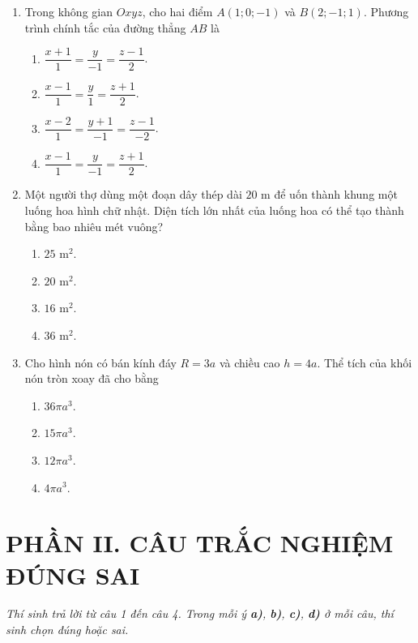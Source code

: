 \documentclass[12pt,a4paper]{article}
\begin{document}
\begin{enumerate}[label=\textbf{Câu \arabic*:}, leftmargin=*]
\item Trong không gian $Oxyz$, cho hai điểm $A(1; 0; -1)$ và $B(2; -1; 1)$. Phương trình chính tắc của đường thẳng $AB$ là
\begin{enumerate}[label=\Alph*.]
    \item $\dfrac{x + 1}{1} = \dfrac{y}{-1} = \dfrac{z - 1}{2}$.
    \item $\dfrac{x - 1}{1} = \dfrac{y}{1} = \dfrac{z + 1}{2}$.
    \item $\dfrac{x - 2}{1} = \dfrac{y + 1}{-1} = \dfrac{z - 1}{-2}$.
    \item $\dfrac{x - 1}{1} = \dfrac{y}{-1} = \dfrac{z + 1}{2}$.
\end{enumerate}

\item Một người thợ dùng một đoạn dây thép dài $20\text{ m}$ để uốn thành khung một luống hoa hình chữ nhật. Diện tích lớn nhất của luống hoa có thể tạo thành bằng bao nhiêu mét vuông?
\begin{enumerate}[label=\Alph*.]
    \item $25\text{ m}^2$.
    \item $20\text{ m}^2$.
    \item $16\text{ m}^2$.
    \item $36\text{ m}^2$.
\end{enumerate}

\item Cho hình nón có bán kính đáy $R = 3a$ và chiều cao $h = 4a$. Thể tích của khối nón tròn xoay đã cho bằng
\begin{enumerate}[label=\Alph*.]
    \item $36\pi a^3$.
    \item $15\pi a^3$.
    \item $12\pi a^3$.
    \item $4\pi a^3$.
\end{enumerate}

\end{enumerate}

\vspace{0.4cm}
\section*{\large PHẦN II. CÂU TRẮC NGHIỆM ĐÚNG SAI}
\textit{Thí sinh trả lời từ câu 1 đến câu 4. Trong mỗi ý \textbf{a)}, \textbf{b)}, \textbf{c)}, \textbf{d)} ở mỗi câu, thí sinh chọn đúng hoặc sai.}
\end{document}
